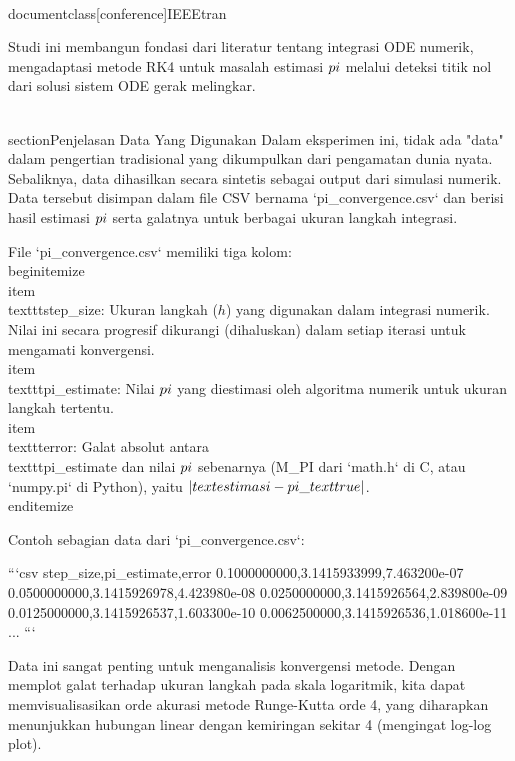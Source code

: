\\documentclass[conference]{IEEEtran}
\begin{document}
Studi ini membangun fondasi dari literatur tentang integrasi ODE numerik, mengadaptasi metode RK4 untuk masalah estimasi $\\pi$ melalui deteksi titik nol dari solusi sistem ODE gerak melingkar.

\\section{Penjelasan Data Yang Digunakan}
Dalam eksperimen ini, tidak ada "data" dalam pengertian tradisional yang dikumpulkan dari pengamatan dunia nyata. Sebaliknya, data dihasilkan secara sintetis sebagai output dari simulasi numerik. Data tersebut disimpan dalam file CSV bernama `pi_convergence.csv` dan berisi hasil estimasi $\\pi$ serta galatnya untuk berbagai ukuran langkah integrasi.

File `pi_convergence.csv` memiliki tiga kolom:
\\begin{itemize}
\\item \\texttt{step\_size}: Ukuran langkah ($h$) yang digunakan dalam integrasi numerik. Nilai ini secara progresif dikurangi (dihaluskan) dalam setiap iterasi untuk mengamati konvergensi.
\\item \\texttt{pi\_estimate}: Nilai $\\pi$ yang diestimasi oleh algoritma numerik untuk ukuran langkah tertentu.
\\item \\texttt{error}: Galat absolut antara \\texttt{pi\_estimate} dan nilai $\\pi$ sebenarnya (M\_PI dari `math.h` di C, atau `numpy.pi` di Python), yaitu $|\\text{estimasi} - \\pi\_{\\text{true}}|$.
\\end{itemize}

Contoh sebagian data dari `pi_convergence.csv`:

```csv
step_size,pi_estimate,error
0.1000000000,3.1415933999,7.463200e-07
0.0500000000,3.1415926978,4.423980e-08
0.0250000000,3.1415926564,2.839800e-09
0.0125000000,3.1415926537,1.603300e-10
0.0062500000,3.1415926536,1.018600e-11
...
```

Data ini sangat penting untuk menganalisis konvergensi metode. Dengan memplot galat terhadap ukuran langkah pada skala logaritmik, kita dapat memvisualisasikan orde akurasi metode Runge-Kutta orde 4, yang diharapkan menunjukkan hubungan linear dengan kemiringan sekitar 4 (mengingat log-log plot).
\end{document}
